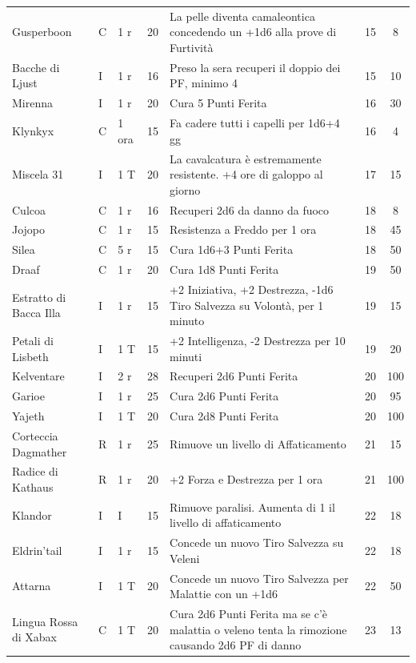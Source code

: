 \begin{xltabular}{\linewidth}{llllXcc}
 Gusperboon & C& 1 r & 20& La pelle diventa camaleontica concedendo un +1d6 alla prove di Furtività & 15 & 8\\
	Bacche di Ljust & I& 1 r & 16& Preso la sera recuperi il doppio dei PF, minimo 4 & 15 & 10 \\
 Mirenna & I& 1 r & 20& Cura 5 Punti Ferita& 16 & 30 \\
	Klynkyx & C& 1 ora & 15& Fa cadere tutti i capelli per 1d6+4 gg & 16 & 4\\
 Miscela 31 & I& 1 T & 20&La cavalcatura è estremamente resistente. +4 ore di galoppo al giorno & 17 & 15\\
	Culcoa & C& 1 r & 16& Recuperi 2d6 da danno da fuoco & 18 & 8 \\
 Jojopo & C& 1 r & 15& Resistenza a Freddo per 1 ora & 18 & 45 \\
	Silea & C& 5 r& 15& Cura 1d6+3 Punti Ferita & 18 & 50 \\
 Draaf & C& 1 r & 20& Cura 1d8 Punti Ferita& 19 & 50 \\
	Estratto di Bacca Illa & I& 1 r & 15& +2 Iniziativa, +2 Destrezza, -1d6 Tiro Salvezza su Volontà, per 1 minuto& 19 & 15\\
 Petali di Lisbeth & I& 1 T & 15&+2 Intelligenza, -2 Destrezza per 10 minuti & 19 & 20 \\
	Kelventare & I& 2 r & 28& Recuperi 2d6 Punti Ferita & 20 & 100 \\
 Garioe & I& 1 r & 25& Cura 2d6 Punti Ferita& 20 & 95 \\
	Yajeth & I& 1 T& 20& Cura 2d8 Punti Ferita& 20 & 100 \\
 Corteccia Dagmather & R& 1 r & 25& Rimuove un livello di Affaticamento& 21 & 15 \\
	Radice di Kathaus & R& 1 r& 20& +2 Forza e Destrezza per 1 ora & 21 & 100 \\
 Klandor & I& I& 15& Rimuove paralisi. Aumenta di 1 il livello di affaticamento& 22 & 18 \\
	Eldrin'tail & I& 1 r& 15& Concede un nuovo Tiro Salvezza su Veleni& 22 & 18 \\
 Attarna & I& 1 T & 20& Concede un nuovo Tiro Salvezza per Malattie con un +1d6& 22 & 50 \\
	Lingua Rossa di Xabax & C& 1 T & 20& Cura 2d6 Punti Ferita ma se c'è malattia o veleno tenta la rimozione causando 2d6 PF di danno & 23 & 13 \\

\end{xltabular}
